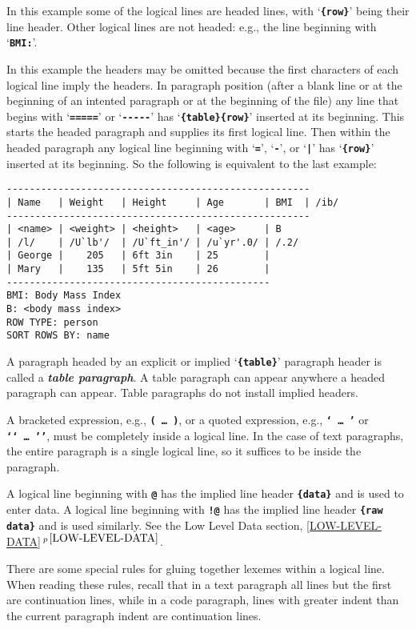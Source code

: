 \documentclass[12pt]{article}
\newcommand{\TT}[1]{{\tt \bfseries #1}}
\newcommand{\key}[1]{{\bf \em #1}\index{#1}}
\newcommand{\itemref}[1]{\ref{#1}$\,^{p\,\pageref{#1}}$}
\newenvironment{indpar}[1][0.3in]%
	{\begin{list}{}%
		     {\setlength{\itemsep}{0in}%
		      \setlength{\topsep}{0in}%
		      \setlength{\parsep}{1ex}%
		      \setlength{\labelwidth}{#1}%
		      \setlength{\leftmargin}{#1}%
		      \addtolength{\leftmargin}{\labelsep}}%
	 \item}%
	{\end{list}}
\begin{document}
In this example some of the logical lines are headed lines,
with `\TT{\{row\}}' being their line header.
Other logical lines are not headed: e.g., the line beginning
with `\TT{BMI:}'.

In this example the headers may be omitted because
the first characters of each logical line imply the headers.
In paragraph position (after a blank line or at the beginning
of an intented paragraph or at the beginning of the file)
any line that begins with `\TT{=====}' or `\TT{-{}-{}-{}-{}-}'
has `\TT{\{table\}\{row\}}' inserted at its beginning.  This
starts the headed paragraph and supplies its first logical
line.  Then within the headed paragraph any logical line
beginning with `\TT{=}', `\TT{-}', or `\TT{|}' has
`\TT{\{row\}}' inserted at its beginning.  So the following
is equivalent to the last example:
\begin{indpar}\begin{verbatim}
-----------------------------------------------------
| Name   | Weight   | Height     | Age       | BMI  | /ib/
-----------------------------------------------------
| <name> | <weight> | <height>   | <age>     | B
| /l/    | /U`lb'/  | /U`ft_in'/ | /u`yr'.0/ | /.2/
| George |    205   | 6ft 3in    | 25        |
| Mary   |    135   | 5ft 5in    | 26        |
----------------------------------------------
BMI: Body Mass Index
B: <body mass index>
ROW TYPE: person
SORT ROWS BY: name
\end{verbatim}\end{indpar}

A paragraph headed by an explicit or implied 
`\TT{\{table\}}' paragraph header is called a \key{table paragraph}.
A table paragraph can appear anywhere a headed paragraph can appear.
Table paragraphs do not install implied headers.

A bracketed expression, e.g., \TT{(~\ldots~)}, or a quoted expression,
e.g., \TT{`~\ldots~'} or \TT{`{}`~\ldots~'{}'},
must be completely inside a logical line.
In the case of text paragraphs, the entire paragraph is a single
logical line, so it suffices to be inside the paragraph.

A logical line beginning with \TT{@} has the implied line header
\TT{\{data\}} and is used to enter data.
A logical line beginning with \TT{!@} has the implied line header
\TT{\{raw data\}} and is used similarly.
See the Low Level Data section, \itemref{LOW-LEVEL-DATA}.

There are some special rules for gluing together lexemes within
a logical line.  When reading these rules, recall that in a text
paragraph all lines but the first are continuation lines, while
in a code paragraph, lines with greater indent than the current paragraph
indent are continuation lines.
\end{document}
